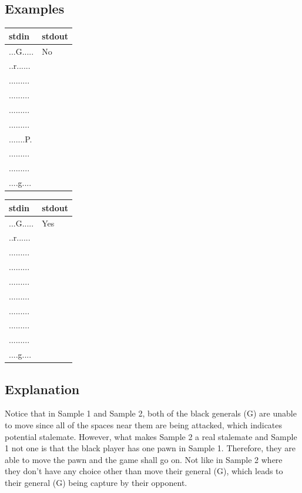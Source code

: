 \documentclass[12pt,a4paper]{article}
\begin{document}
\subsection*{\fontsize{16}{12}Examples}
\begin{table}[h]
  \centering
  \begin{tabularx}{\textwidth}{|>{\ttfamily}X|>{\ttfamily}X|}
  \hline
  stdin & stdout\\
  \hline
    ...G.....&No\\
    ..r......&\\
    .........&\\
    .........&\\
    .........&\\
    .........&\\
    .......P.&\\
    .........&\\
    .........&\\
    ....g....&\\
  \hline
 \end{tabularx}
\end{table}

\begin{table}[h]
  \centering
  \begin{tabularx}{\textwidth}{|>{\ttfamily}X|>{\ttfamily}X|}
  \hline
  stdin & stdout\\
  \hline
    ...G.....&Yes\\
    ..r......&\\
    .........&\\
    .........&\\
    .........&\\
    .........&\\
    .........&\\
    .........&\\
    .........&\\
    ....g....&\\
  \hline
 \end{tabularx}
\end{table}

\subsection*{\fontsize{16}{12}Explanation}
Notice that in Sample 1 and Sample 2, both of the black generals (G) are unable to move since all of the spaces near them are being attacked, which indicates potential stalemate. However, what makes Sample 2 a real stalemate and Sample 1 not one is that the black player has one pawn in Sample 1. Therefore, they are able to move the pawn and the game shall go on. Not like in Sample 2 where they don't have any choice other than move their general (G), which leads to their general (G) being capture by their opponent.
\end{document}
